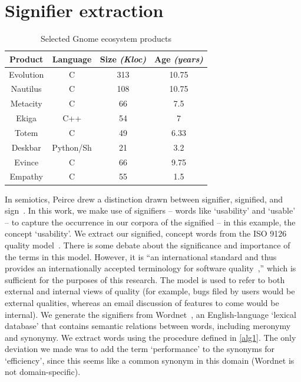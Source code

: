 \documentclass[conference, compsoc]{IEEEtran}
\begin{document}
\section{Signifier extraction}
\label{sec:Method}
\begin{table}
	\caption{Selected Gnome ecosystem products}
	\centering
	\label{tbl:projects}
\begin{tabular}{|c|c|c|c|}
\hline
\rowcolor[gray]{.9} 
\textbf{Product} & \textbf{Language} & \textbf{Size} \emph{(Kloc)} & \textbf{Age} \emph{(years)} \\
\hline
\hline 
Evolution & C & 313 & 10.75\\ \hline
Nautilus & C & 108 & 10.75  \\ \hline
Metacity & C & 66 & 7.5  \\ \hline
Ekiga & C++ & 54 & 7  \\ \hline
Totem & C & 49 & 6.33  \\ \hline
Deskbar & Python/Sh & 21 & 3.2  \\ \hline
Evince & C & 66 & 9.75\\ \hline
Empathy &C & 55 & 1.5\\ 
\hline
\end{tabular}
\end{table}

In semiotics, Peirce drew a distinction drawn between signifier, signified, and sign~\cite{atkin2006}. In this work, we make use of signifiers -- words like `usability' and `usable' -- to capture the occurrence in our corpora of the signified -- in this example, the concept `usability'. We extract our signified, concept words from the ISO 9126 quality model~\cite{iso9126}. There is some debate about the significance and importance of the terms in this model. However, it is ``an international standard and thus provides an internationally accepted terminology for software quality~\cite[p. 58]{Boegh2008},'' which is sufficient for the purposes of this research. The model is used to refer to both external and internal views of quality (for example, bugs filed by users would be external qualities, whereas an email discussion of features to come would be internal). We generate the signifiers from Wordnet~\cite{Fellbaum1998}, an English-language `lexical database' that contains semantic relations between words, including meronymy and synonymy. We extract words using the procedure defined in \ref{alg1}. The only deviation we made was to add the term `performance' to the synonyms for `efficiency', since this seems like a common synonym in this domain (Wordnet is not domain-specific). %
\end{document}
